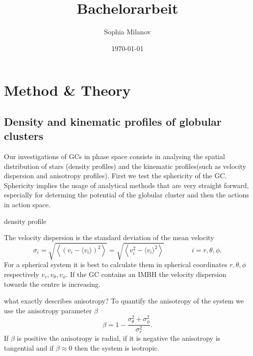 \documentclass[a4paper,12pt,abstracton]{scrartcl}
\title{Bachelorarbeit}
\author{Sophia Milanov}
\date{\today}
\begin{document}
\onehalfspacing


\begin{abstract}
\blindtext 
\end{abstract}

\newpage

\tableofcontents

\newpage




\newpage
\section{Method \& Theory}
\subsection{Density and kinematic profiles of globular clusters}\label{sec2.1}
Our investigations of \ac{GCs} in phase space consists in analysing the spatial distribution of stars (density profiles) and the kinematic profiles(such as velocity dispersion and anisotropy profiles). First we test the sphericity of the \ac{GC}. Sphericity implies the usage of analytical methods that are very straight forward, especially for determing the potential of the globular cluster and then the actions in action space.\par \color{red} density profile \color{black} \par The velocity dispersion is the standard deviation of the mean velocity 
\begin{equation}
\sigma_i=\sqrt{\left\langle(v_i-\langle v_i\rangle)^2\right\rangle}=\sqrt{\left\langle v_i^2-\langle v_i\rangle^2\right\rangle} \qquad\qquad i=r,\theta,\phi.
\end{equation} For a spherical system it is best to calculate them in spherical coordinates \(r,\theta,\phi\) respectively \(v_r,v_{\theta},v_{\phi}\). If the \ac{GC} contains an \ac{IMBH} the velocity dispersion towards the centre is increasing. 
\par \color{red} what exactly describes anisotropy? \color{black} To quantify the anisotropy of the system we use the anisotropy parameter \(\beta\) 
\begin{equation}
\beta=1-\frac{\sigma_\theta ^2+\sigma_\phi ^2}{\sigma_r ^2}.
\end{equation} If \(\beta\) is positive the anisotropy is radial, if it is negative the anisotropy is tangential and if \(\beta\approx0\) then the system is isotropic.
\end{document}
